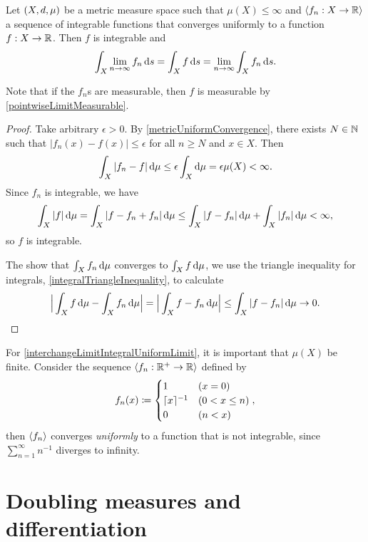 \begin{proposition} \label{interchangeLimitIntegralUniformLimit}
Let $\sSet{X,d, \mu}$ be a metric measure space such that $\mu(X)\leq \infty$ and $\left\langle f_n: X\to \mathbb{R} \right\rangle$ a sequence of integrable functions that converges uniformly to a function $f:X \to \mathbb{R}$. Then $f$ is integrable and
\[ \int_X\lim_{n\to\infty}f_n \operatorname{d \!}{s} = \int_X f \operatorname{d \!}{s} = \lim_{n\to\infty}\int_X f_n \operatorname{d \!}{s}. \]
\end{proposition}
Note that if the $f_n$s are measurable, then $f$ is measurable by \ref{pointwiseLimitMeasurable}.
\begin{proof}
Take arbitrary $\epsilon >0$. By \ref{metricUniformConvergence}, there exists $N\in \mathbb{N}$ such that $|f_n(x) - f(x)| \leq \epsilon$ for all $n\geq N$ and $x\in X$. Then
\[ \int_X |f_n - f| \operatorname{d \!}{\mu} \leq \epsilon \int_X \operatorname{d \!}{\mu} = \epsilon \mu(X) < \infty. \]
Since $f_n$ is integrable, we have
\[ \int_X |f| \operatorname{d \!}{\mu} = \int_X |f-f_n + f_n| \operatorname{d \!}{\mu} \leq \int_X |f-f_n| \operatorname{d \!}{\mu} + \int_X |f_n| \operatorname{d \!}{\mu} < \infty, \]
so $f$ is integrable.

The show that $\int_X f_n \operatorname{d \!}{\mu}$ converges to $\int_X f \operatorname{d \!}{\mu}$, we use the triangle inequality for integrals, \ref{integralTriangleInequality}, to calculate
\[ \Big|\int_X f\operatorname{d \!}{\mu} - \int_X f_n\operatorname{d \!}{\mu}\Big| = \Big|\int_X f- f_n\operatorname{d \!}{\mu}\Big| \leq \int_X|f-f_n|\operatorname{d \!}{\mu} \to 0. \]
\end{proof}

\begin{example}
For \ref{interchangeLimitIntegralUniformLimit}, it is important that $\mu(X)$ be finite. Consider the sequence $\left\langle f_n: \mathbb{R}^+ \to \mathbb{R} \right\rangle$ defined by
\[ f_n(x) \coloneqq \begin{cases} 1 & (x = 0) \\
\lceil x\rceil^{-1} & (0 < x \leq n) \\
0 & (n < x)
\end{cases}, \]
then $\left\langle f_n \right\rangle$ converges \emph{uniformly} to a function that is not integrable, since $\sum_{n=1}^\infty n^{-1}$ diverges to infinity.
\end{example}

\section{Doubling measures and differentiation}
